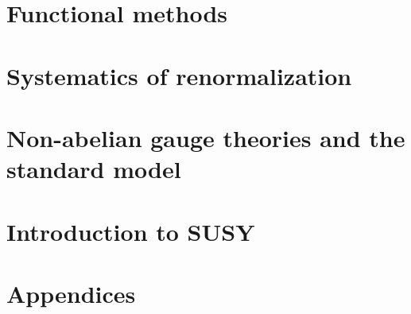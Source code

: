 \documentclass[fontsize=10pt,%
               a4paper,%
               twoside,%
               openright,%
               titlepage,%
               fleqn,%
               headinclude=true,%
               footinclude=true,%
               BCOR5mm,%
               numbers=noenddot,%
               cleardoublepage=empty,%
               captions=tableheading,%
               version=first,english,%
               abstracton%
               ]{scrreprt}                %
\begin{document}
\pagestyle{plain}



%
%
%
\pagestyle{scrheadings} 



\cleardoublepage
\cleardoublepage
{}
\cleardoublepage
\cleardoublepage
\part{Functional methods}


\cleardoublepage
\part{Systematics of renormalization}
%
%
%
\cleardoublepage
\part{Non-abelian gauge theories and the standard model}

\cleardoublepage
\part{Introduction to SUSY}
\cleardoublepage
\part{Appendices}
\appendix








\end{document}
